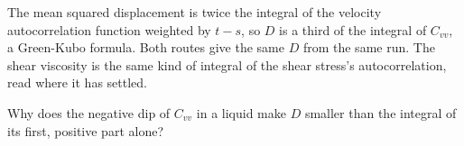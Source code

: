 \begin{keyidea}
The mean squared displacement is twice the integral of the velocity
autocorrelation function weighted by $t - s$, so $D$ is a third of the
integral of $C_{vv}$, a Green-Kubo formula. Both routes give the same $D$
from the same run. The shear viscosity is the same kind of integral of
the shear stress's autocorrelation, read where it has settled.
\end{keyidea}


\begin{selfcheck}
Why does the negative dip of $C_{vv}$ in a liquid make $D$ smaller than
the integral of its first, positive part alone?
\end{selfcheck}
